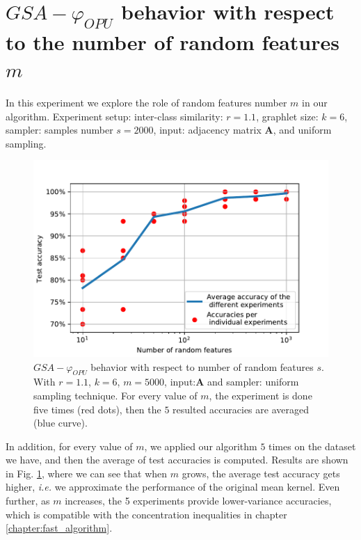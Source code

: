 \section{$GSA-\varphi_{OPU}$ behavior with respect to the number of random features $m$}
In this experiment we explore the role of random features number $m$ in our algorithm. 
Experiment setup: inter-class similarity: $r=1.1$, graphlet size: $k=6$, sampler: samples number $s=2000$, input: adjacency matrix $\mathbf{A}$, and uniform sampling.
\begin{figure}[H]
\centering
\includegraphics[scale=0.5]{Dissertation/figs/LightON_adj_SBM_varying_RF.PDF}
\caption[$GSA-\varphi_{OPU}$ behavior with respect to number of random features $m$]{$GSA-\varphi_{OPU}$ behavior with respect to number of random features $s$. With  $r=1.1$, $k=6$, $m=5000$, input:$\mathbf{A}$ and sampler: uniform sampling technique. For every value of $m$, the experiment is done five times (red dots), then the $5$ resulted accuracies are averaged (blue curve).}
\label{fig:varying_random_features}
\end{figure}
In addition, for every value of $m$, we applied our algorithm $5$ times on the dataset we have, and then the average of test accuracies is computed. Results are shown in Fig. \ref{fig:varying_random_features}, where we can  see that when $m$ grows, the average test accuracy gets higher, \emph{i.e.} we approximate the performance of the original mean kernel. Even further, as $m$ increases, the 5 experiments provide lower-variance accuracies, which is compatible with the concentration inequalities in chapter \ref{chapter:fast_algorithm}.

